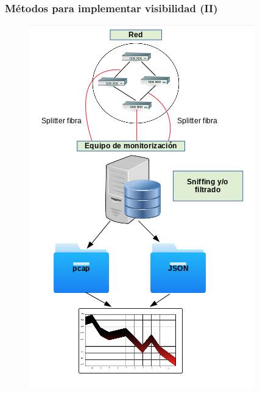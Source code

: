 \documentclass{beamer}
\begin{document}
\begin{frame}
\frametitle{Métodos para implementar visibilidad (II)}

\begin{figure}[H]
	\centering
	\includegraphics[scale=0.35]{directo.png}
	\label{directo}
\end{figure}

\end{frame}
\end{document}
